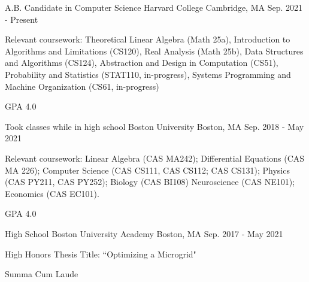 

\begin{cventries}

  \cventry
    {A.B. Candidate in Computer Science} %
    {Harvard College} %
    {Cambridge, MA} %
    {Sep. 2021 - Present} %
    {
      \begin{cvitems}
        \item{Relevant coursework: Theoretical Linear Algebra (Math 25a), Introduction to Algorithms and Limitations (CS120), Real Analysis (Math 25b), Data Structures and Algorithms (CS124), Abstraction and Design in Computation (CS51), Probability and Statistics (STAT110, in-progress), Systems Programming and Machine Organization (CS61, in-progress)}
        \item {GPA 4.0}
      \end{cvitems}
    }
  
  \cventry
    {Took classes while in high school} %
    {Boston University} %
    {Boston, MA} %
    {Sep. 2018 - May 2021} %
    {
      \begin{cvitems}
        \item{Relevant coursework: Linear Algebra (CAS MA242); Differential Equations (CAS MA 226); 
        Computer Science (CAS CS111, CAS CS112; CAS CS131); Physics (CAS PY211, CAS PY252); Biology (CAS BI108)
        Neuroscience (CAS NE101); Economics (CAS EC101).}
        \item {GPA 4.0}
      \end{cvitems}
    }
   
  \cventry
    {High School} %
    {Boston University Academy} %
    {Boston, MA} %
    {Sep. 2017 - May 2021} %
    {
      \begin{cvitems}
        \item {High Honors Thesis Title: ``Optimizing a Microgrid"}
        \item {Summa Cum Laude}
      \end{cvitems}
    }


\end{cventries}
